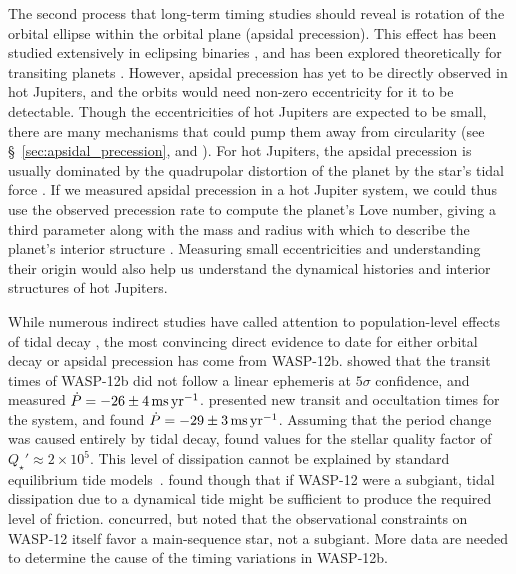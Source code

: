 \documentclass[12pt,twocolumn,tighten]{aastex62}
\begin{document}
The second process that long-term timing studies should reveal is
rotation of the orbital ellipse within the orbital plane (apsidal
precession).  This effect has been studied extensively in eclipsing
binaries \citep[{\it e.g.},][]{russell_notes_1939,
schwarzschild_structure_1958,borkovits_eclipse_2015}, and has been
explored theoretically for transiting planets
\citep{heyl_using_2007,pal_periastron_2008,jordan_observability_2008,ragozzine_probing_2009}.
However, apsidal precession has yet to be directly observed in hot
Jupiters, and the orbits would need non-zero eccentricity for it to be
detectable.  Though the eccentricities of hot Jupiters are expected to
be small, there are many mechanisms that could pump them away from
circularity (see \S~\ref{sec:apsidal_precession}, and
\citealt{bailey_understanding_2019}).  For hot Jupiters, the apsidal
precession is usually dominated by the quadrupolar distortion of the
planet by the star's tidal force \citep{ragozzine_probing_2009}.  If we
measured apsidal precession in a hot Jupiter system, we could thus use
the observed precession rate to compute the planet's Love number, giving
a third parameter along with the mass and radius with which to describe
the planet's interior structure \citep[{\it e.g.},][who performed a
similar procedure for HAT-P-13b]{batygin_determination_2009}.  Measuring
small eccentricities and understanding their origin would also help us
understand the dynamical histories and interior structures of hot
Jupiters.  \citep[{\it
e.g.},][respectively]{dawson_origins_2018,ibgui_tidal_2010}

While numerous indirect studies have called attention to
population-level effects of tidal decay
\citep{jackson_observational_2009,hansen_calibration_2010,penev_constraining_2012,husnoo_observational_2012,matsakos_origin_2016,cameron_hierarchical_2018,penev_empirical_2018},
the most convincing direct evidence to date for either orbital decay or
apsidal precession has come from WASP-12b.
\citet{maciejewski_departure_2016} showed that the transit times of
WASP-12b did not follow a linear ephemeris at $5\sigma$ confidence, and
measured $\dot{P} = -26 \pm 4\,{\rm ms}\,{\rm yr}^{-1}$.
\citet{patra_2017} presented new transit and occultation times for the
system, and found $\dot{P} = -29 \pm 3\,{\rm ms}\,{\rm yr}^{-1}$.
Assuming that the period change was caused entirely by tidal decay,
\citet{patra_2017} found values for the stellar quality factor of
$Q_\star' \approx 2\times10^5$.  This level of dissipation cannot be
explained by standard equilibrium tide
models~\citep{penev_tidal_2011,ogilvie_tidal_2014}.
\citet{weinberg_tidal_2017} found though that if WASP-12 were a
subgiant, tidal dissipation due to a dynamical tide might be sufficient
to produce the required level of friction.
\cite{bailey_understanding_2019} concurred, but noted that the
observational constraints on WASP-12 itself favor a main-sequence star,
not a subgiant.  More data are needed to determine the cause of the
timing variations in WASP-12b.
\end{document}
